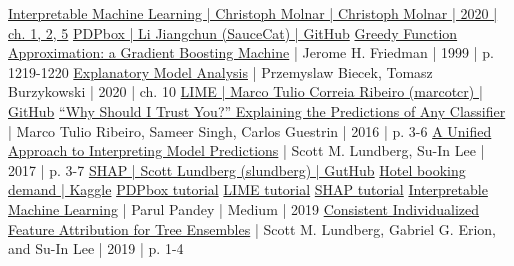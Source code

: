 \documentclass[a4paper, 12pt]{article}
\begin{document}
	\begin{thebibliography}{99}
		\href{https://christophm.github.io/interpretable-ml-book/}{Interpretable Machine Learning | Christoph Molnar | Christoph Molnar | 2020 | ch. 1, 2, 5}
		\href{https://github.com/SauceCat/PDPbox}{PDPbox | Li Jiangchun (SauceCat) | GitHub}
		\href{https://www.cse.cuhk.edu.hk/irwin.king/_media/presentations/2001_greedy_function_approximation_a_gradient_boosting_machine.pdf}{Greedy Function Approximation: a Gradient Boosting Machine} | Jerome H. Friedman | 1999 | p. 1219-1220
		\href{https://pbiecek.github.io/ema/LIME.html}{Explanatory Model Analysis} | Przemyslaw Biecek, Tomasz Burzykowski | 2020 | ch. 10
		\href{https://github.com/marcotcr/lime}{LIME | Marco Tulio Correia Ribeiro (marcotcr) | GitHub}
		\href{https://arxiv.org/pdf/1602.04938.pdf}{“Why Should I Trust You?” Explaining the Predictions of Any Classifier} | Marco Tulio Ribeiro, Sameer Singh, Carlos Guestrin | 2016 | p. 3-6
		\href{https://arxiv.org/pdf/1705.07874.pdf}{A Unified Approach to Interpreting Model Predictions} | Scott M. Lundberg, Su-In Lee | 2017 | p. 3-7
		\href{https://github.com/slundberg/shap}{SHAP | Scott Lundberg (slundberg) | GutHub}
		\href{https://www.kaggle.com/jessemostipak/hotel-booking-demand}{Hotel booking demand | Kaggle}
		\href{https://pdpbox.readthedocs.io/en/latest/}{PDPbox tutorial}
		\href{https://lime-ml.readthedocs.io/en/latest/}{LIME tutorial}
		\href{https://shap.readthedocs.io/en/latest/}{SHAP tutorial}
		\href{https://towardsdatascience.com/interpretable-machine-learning-1dec0f2f3e6b}{Interpretable Machine Learning} | Parul Pandey | Medium | 2019
		\href{https://arxiv.org/pdf/1802.03888.pdf}{Consistent Individualized Feature Attribution for Tree Ensembles} | Scott M. Lundberg, Gabriel G. Erion, and Su-In Lee | 2019 | p. 1-4
	\end{thebibliography}
	\newpage
\end{document}
